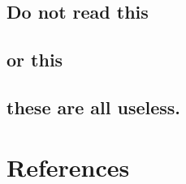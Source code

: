 \documentclass[12pt]{article}%
\begin{document}
\subsection{Do not read this}
\lipsum[1-3]

\subsection{or this}
\lipsum[4]

\subsection{these are all useless.}
\lipsum[5]

{}
\section*{References}
\printbibliography[title= \vspace{-1cm}]

\end{document}
